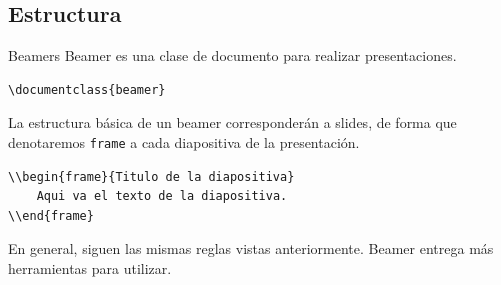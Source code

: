 \documentclass[../slides.tex]{subfiles}
\begin{document}
    \begin{frame}
        \tableofcontents[sections=\value{section}]
    \end{frame}
    
    \subsection{Estructura}
    
    \begin{frame}[fragile]{Beamers}
        Beamer es una clase de documento para realizar presentaciones.

            \begin{verbatim}
\documentclass{beamer}
            \end{verbatim}

        La estructura básica de un beamer corresponderán a slides, de forma que denotaremos \texttt{frame} a cada diapositiva de la presentación.
        
        \begin{verbatim}
\\begin{frame}{Titulo de la diapositiva}
    Aqui va el texto de la diapositiva.
\\end{frame}
        \end{verbatim}

        En general, siguen las mismas reglas vistas anteriormente. Beamer entrega más herramientas para utilizar.
    \end{frame}
\end{document}
